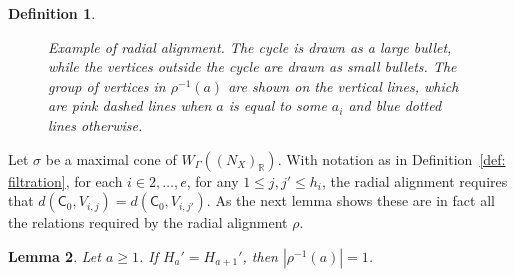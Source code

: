 \documentclass{article}
\newtheorem{definition}{Definition}[section]
\newtheorem{lemma}[definition]{Lemma}
\newcommand{\tropC}{\mathsf{C}}
\begin{document}
\begin{definition}
\begin{figure}[h]
        \caption{Example of radial alignment. The cycle is drawn as a large bullet, while the vertices outside the cycle are drawn as small bullets. The group of vertices in $\rho^{-1}(a)$ are shown on the vertical lines, which are pink dashed lines when $a$ is equal to some $a_i$ and blue dotted lines otherwise. }
        \label{fig:radial alignment}
    \end{figure}	
    
    \end{definition}
    
    Let $\sigma$ be a maximal cone of $W_{\Gamma}((N_X)_{\mathbb{R}})$. With notation as in Definition~\ref{def: filtration}, for each $i \in 2, \ldots, e$, for any $1 \leq j, j' \leq h_i$, the radial alignment requires that $d(\tropC_0, V_{i,j}) = d(\tropC_0, V_{i,j'})$. As the next lemma shows these are in fact all the relations required by the radial alignment $\rho$.
    
    
    \begin{lemma}\label{lemma: Ha'=Ha+1'}
        Let $a \geq 1$. If $H_a'=H_{a+1}'$, then $|\rho^{-1}(a)|=1$. 
    \end{lemma}
\end{document}
